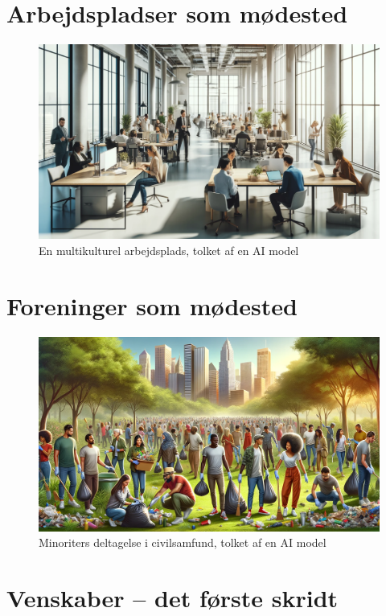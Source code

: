 \documentclass[
]{book}
\begin{document}
\hypertarget{kap4}{%
\chapter{Arbejdspladser som mødested}\label{kap4}}

\begin{figure}
\includegraphics[width=24.89in]{images/dalle-work} \caption{En multikulturel arbejdsplads, tolket af en AI model}\label{fig:fig-work}
\end{figure}

\hypertarget{kap5}{%
\chapter{Foreninger som mødested}\label{kap5}}

\begin{figure}
\includegraphics[width=24.89in]{images/dalle-civil} \caption{Minoriters deltagelse i civilsamfund, tolket af en AI model}\label{fig:fig-civil}
\end{figure}

\hypertarget{kap6}{%
\chapter{Venskaber -- det første skridt}\label{kap6}}
\end{document}
